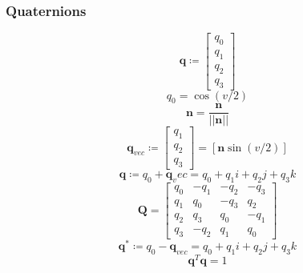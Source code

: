 \documentclass[12pt,a4paper,oneside]{article}
\begin{document}
\subsubsection{Quaternions}
\cite{hamilton1844lxxviii}\par
\cite{cayley1845xiii}\par
\cite{courant1953methods}\par
\cite{mebius2005matrix}\par
\cite{mathworldconjugate}\par
\cite{shoemake1985animating}\par
\cite{horn1987closed}\par
\begin{equation}
\bm{q} \coloneqq \begin{bmatrix}
q_0 \\
q_1 \\
q_2 \\
q_3
\end{bmatrix}
\end{equation}
\begin{equation}
q_0 = \cos(v/2)
\end{equation}
\begin{equation}
\bm{n} = \frac{\bm{n}}{||\bm{n}||}
\end{equation}
\begin{equation}
\bm{q}_{vec} \coloneqq \begin{bmatrix}
q_1 \\
q_2 \\
q_3
\end{bmatrix}
= [\bm{n}\sin(v/2)]
\end{equation}
\begin{equation}
\bm{q} \coloneqq q_0 + \bm{q}_vec = q_0 + q_1i + q_2j+ q_3k
\end{equation}
\begin{equation}
\bm{Q} = \begin{bmatrix}
q_0 & -q_1 & -q_2 & -q_3 \\
q_1 & q_0 & -q_3 & q_2 \\
q_2 & q_3 & q_0 & -q_1 \\
q_3 & -q_2 & q_1 & q_0
\end{bmatrix}
\end{equation}
\begin{equation}
\bm{q}^* \coloneqq q_0 - \bm{q}_{vec} = q_0 + q_1i + q_2j+ q_3k
\end{equation}
\begin{equation}
\bm{q}^T\bm{q} = 1
\end{equation}
\end{document}
